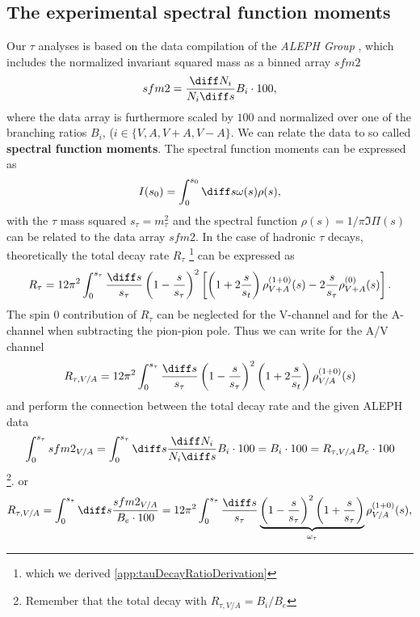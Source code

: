 \subsection{The experimental spectral function moments}
Our $\tau$ analyses is based on the data compilation of the \textit{ALEPH Group} \cite{ALEPH2013}, which includes the normalized invariant squared mass as a binned array $sfm2$
\begin{equation}
	sfm2 = \frac{\diff N_i}{N_i \diff s} B_i \cdot 100,
\end{equation}
where the data array is furthermore scaled by $100$ and normalized over one of the branching ratios $B_i$, ($i \in \{V, A, V+A, V-A\}$. We can relate the data to so called \textbf{spectral function moments}. The spectral function moments can be expressed as
\begin{equation}
	I(s_0) = \int_0^{s_0} \diff s \omega(s) \rho(s),
\end{equation}
with the $\tau$ mass squared $s_\tau = m_\tau^2$ and the spectral function $\rho(s) = 1/\pi \Im \Pi(s)$ can be related to the data array $sfm2$. In the case of hadronic $\tau$ decays, theoretically the total decay rate $R_\tau$  \footnote{which we derived \ref{app:tauDecayRatioDerivation} } can be expressed as
\begin{equation}
	R_\tau = 12 \pi^2 \int_0^{s_\tau} \frac{\diff s}{s_\tau} \left(1 - \frac{s}{s_\tau}\right)^2 \left[ \left( 1+2 \frac{s}{s_t} \right) \rho_{V+A}^{(1+0)}(s) - 2 \frac{s}{s_\tau} \rho_{V+A}^{(0)} (s) \right].
\end{equation}
The spin 0 contribution of $R_\tau$ can be neglected for the V-channel and for the A-channel when subtracting the pion-pion pole. Thus we can write for the A/V channel
\begin{equation}
	R_{\tau, V/A} = 12 \pi^2 \int_0^{s_\tau} \frac{\diff s}{s_\tau} \left(1 - \frac{s}{s_\tau}\right)^2 \left( 1+2 \frac{s}{s_t} \right) \rho_{V/A}^{(1+0)}(s)
\end{equation}
and perform the connection between the total decay rate and the given ALEPH data
\begin{equation}
	\int_0^{s_\tau} sfm2_{V/A} = \int_0^{s_\tau} \diff s \frac{\diff N_i}{N_i \diff s} B_i \cdot 100 = B_i \cdot 100 = R_{\tau, V/A} B_e \cdot 100
\end{equation}\footnote{Remember that the total decay with $R_{\tau,V/A} = B_i/B_e$}.
or 
\begin{equation}
	R_{\tau, V/A} = \int_0^{s_\tau} \diff s \frac{sfm2_{V/A}}{B_e\cdot 100} = 12 \pi^2 \int_0^{s_\tau} \frac{\diff s}{s_\tau} \underbrace{\left(1-\frac{s}{s_\tau}\right)^2\left(1+\frac{s}{s_\tau}\right)}_{\omega_\tau} \rho_{V/A}^{(1+0)}(s),
\end{equation}

